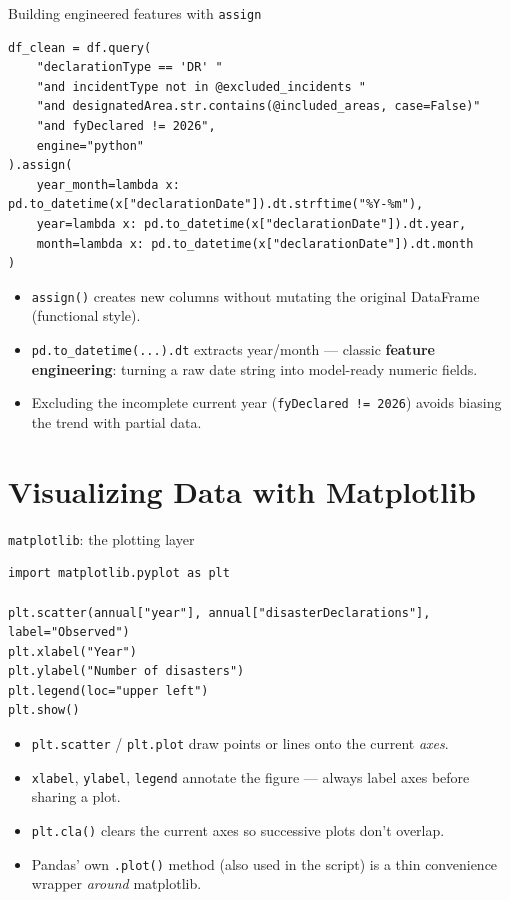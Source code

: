 \documentclass[11pt,aspectratio=43]{beamer}
\begin{document}
\begin{frame}[fragile]{Building engineered features with \texttt{assign}}
\begin{lstlisting}
df_clean = df.query(
    "declarationType == 'DR' "
    "and incidentType not in @excluded_incidents "
    "and designatedArea.str.contains(@included_areas, case=False)"
    "and fyDeclared != 2026",
    engine="python"
).assign(
    year_month=lambda x: pd.to_datetime(x["declarationDate"]).dt.strftime("%Y-%m"),
    year=lambda x: pd.to_datetime(x["declarationDate"]).dt.year,
    month=lambda x: pd.to_datetime(x["declarationDate"]).dt.month
)
\end{lstlisting}
\begin{itemize}
  \item \texttt{assign()} creates new columns without mutating the original DataFrame (functional style).
  \item \texttt{pd.to\_datetime(...).dt} extracts year/month --- classic \textbf{feature engineering}: turning a raw date string into model-ready numeric fields.
  \item Excluding the incomplete current year (\texttt{fyDeclared != 2026}) avoids biasing the trend with partial data.
\end{itemize}
\end{frame}

\section{Visualizing Data with Matplotlib}

\begin{frame}[fragile]{\texttt{matplotlib}: the plotting layer}
\begin{lstlisting}
import matplotlib.pyplot as plt

plt.scatter(annual["year"], annual["disasterDeclarations"], label="Observed")
plt.xlabel("Year")
plt.ylabel("Number of disasters")
plt.legend(loc="upper left")
plt.show()
\end{lstlisting}
\begin{itemize}
  \item \texttt{plt.scatter} / \texttt{plt.plot} draw points or lines onto the current \emph{axes}.
  \item \texttt{xlabel}, \texttt{ylabel}, \texttt{legend} annotate the figure --- always label axes before sharing a plot.
  \item \texttt{plt.cla()} clears the current axes so successive plots don't overlap.
  \item Pandas' own \texttt{.plot()} method (also used in the script) is a thin convenience wrapper \emph{around} matplotlib.
\end{itemize}
\end{frame}
\end{document}
